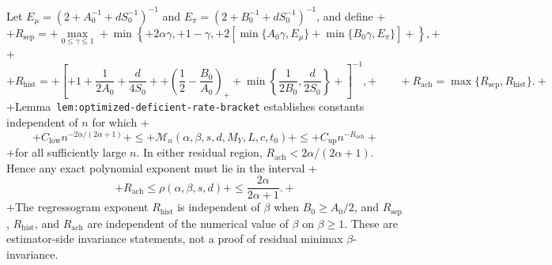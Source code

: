 Let \(E_\mu=(2+A_0^{-1}+dS_0^{-1})^{-1}\) and \(E_\pi=(2+B_0^{-1}+dS_0^{-1})^{-1}\), and define
+\[
+R_{\mathrm{sep}}=
+\max_{0\le\gamma\le1}
+\min\left\{
+2\alpha\gamma,
+1-\gamma,
+2\left[\min\{A_0\gamma,E_\mu\}+\min\{B_0\gamma,E_\pi\}\right]
+\right\},
+\]
+\[
+R_{\mathrm{hist}}=
+\left[
+1+\frac1{2A_0}+\frac d{4S_0}
++\left(\frac12-\frac{B_0}{A_0}\right)_+
+\min\left\{\frac1{2B_0},\frac d{2S_0}\right\}
+\right]^{-1},
+\qquad
+R_{\mathrm{ach}}=\max\{R_{\mathrm{sep}},R_{\mathrm{hist}}\}.
+\]
+Lemma~\texttt{lem:optimized-deficient-rate-bracket} establishes constants independent of \(n\) for which
+\[
+C_{\mathrm{low}}n^{-2\alpha/(2\alpha+1)}
+\le
+\mathcal M_n(\alpha,\beta,s,d,M_Y,L,c,t_0)
+\le
+C_{\mathrm{up}}n^{-R_{\mathrm{ach}}}
+\]
+for all sufficiently large \(n\). In either residual region, \(R_{\mathrm{ach}}<2\alpha/(2\alpha+1)\). Hence any exact polynomial exponent must lie in the interval
+\[
+R_{\mathrm{ach}}\le\rho(\alpha,\beta,s,d)
+\le\frac{2\alpha}{2\alpha+1}.
+\]
+The regressogram exponent \(R_{\mathrm{hist}}\) is independent of \(\beta\) when \(B_0\ge A_0/2\), and \(R_{\mathrm{sep}}\), \(R_{\mathrm{hist}}\), and \(R_{\mathrm{ach}}\) are independent of the numerical value of \(\beta\) on \(\beta\ge1\). These are estimator-side invariance statements, not a proof of residual minimax \(\beta\)-invariance.
